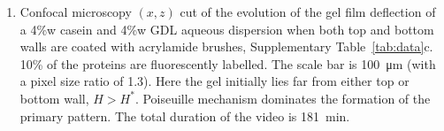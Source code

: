 \documentclass[twocolumn,superscriptaddress,showpacs,preprintnumbers,
amsmath,amssymb,prl]{revtex4-1}
\begin{document}
\begin{enumerate}
\item\label{vid:cutPoiseuille} Confocal microscopy $(x,z)$ cut of the evolution of the gel film deflection of a 4\%w casein and 4\%w GDL aqueous dispersion when both top and bottom walls are coated with acrylamide brushes, Supplementary Table~\ref{tab:data}c. 10\% of the proteins are fluorescently labelled. The scale bar is \SI{100}{\micro\metre} (with a pixel size ratio of 1.3). Here the gel initially lies far from either top or bottom wall, $H>H^*$. Poiseuille mechanism dominates the formation of the primary pattern. The total duration of the video is \SI{181}{\minute}.

\end{enumerate}
\end{document}

